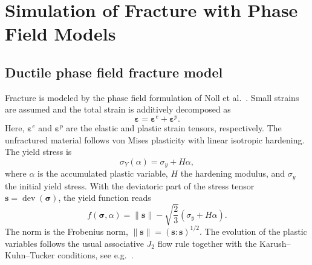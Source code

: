 \documentclass[pamm,a4paper,fleqn]{w-art}
\newcommand{\added}[2][]{#2}
\begin{document}
\section{Simulation of Fracture with Phase Field
  Models}\label{sec:simulation_phase_field_models}


\subsection{Ductile phase field fracture
  model}\label{sec:phase_field_model_ductile}

Fracture is modeled by the phase field
formulation of Noll et al.~\cite{noll_3d_2020}. Small strains are
assumed and the total strain is additively decomposed as
\begin{equation}
  \boldsymbol{\varepsilon} =
  \boldsymbol{\varepsilon}^e+\boldsymbol{\varepsilon}^p .
\end{equation}
\added{Here, \(\boldsymbol{\varepsilon}^e\) and
\(\boldsymbol{\varepsilon}^p\) are the elastic and plastic strain
tensors, respectively.}
The unfractured material follows von Mises plasticity with linear
isotropic hardening. The yield stress is
\begin{equation}
  \sigma_Y(\alpha)=\sigma_y+H\alpha,
\end{equation}
where \(\alpha\) is the accumulated plastic variable, \(H\) the
hardening modulus, and \(\sigma_y\) the initial yield stress. With
the deviatoric part of the stress tensor
\(\boldsymbol{s}=\operatorname{dev}(\boldsymbol{\sigma})\), the yield
function reads
\begin{equation}
  f(\boldsymbol{\sigma},\alpha)
  = \|\boldsymbol{s}\|
  - \sqrt{\frac{2}{3}}
  \left(\sigma_y+H\alpha\right).
\end{equation}
\added{The norm is the Frobenius norm,
\(\|\boldsymbol{s}\|=(\boldsymbol{s}:\boldsymbol{s})^{1/2}\).}
The evolution of the plastic variables follows the usual associative
\(J_2\) flow rule together with the Karush--Kuhn--Tucker
conditions, see e.g.~\cite{simo_computational_1998}.
\end{document}
